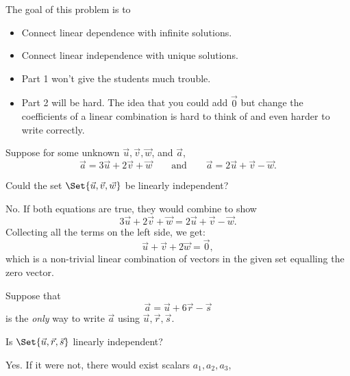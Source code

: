\documentclass{workbook}
\newcommand{\displayonlynewpage}{\begin{displayonly}\newpage\end{displayonly}}
\newcommand{\bookonlynewpage}{\begin{bookonly}\newpage\end{bookonly}}
\begin{document}
\begin{slide}
	\displayonlynewpage
	\bookonlynewpage
	\question
	\begin{annotation}
		\begin{goals}

			The goal of this problem is to
			\begin{itemize}
				\item Connect linear dependence with infinite solutions.
				\item Connect linear independence with unique solutions.
			\end{itemize}
		\end{goals}

		\begin{notes}
			\begin{itemize}
				\item Part 1 won't give the students much trouble.
				\item Part 2 will be hard. The idea that you could add $\vec 0$
					but change the coefficients of a linear combination
					is hard to think of and even harder to write correctly.
			\end{itemize}
		\end{notes}
	\end{annotation}
	Suppose for some unknown $\vec u, \vec v, \vec w$, and $\vec a$,
	\[
		\vec a = 3\vec u+2\vec v +\vec w\qquad \text{and}\qquad
		\vec a = 2\vec u+\vec v -\vec w.
	\]
	\begin{parts}
		\item Could the set $\Set{\vec u,\vec v,\vec w}$ be linearly
		independent?
			\begin{solution}
				No. If both equations are true, they would combine to show
				\[
					3\vec u+2\vec v +\vec w = 2\vec u+\vec v -\vec w.
				\]
				Collecting all the terms on the left side, we get:
				\[
					\vec u + \vec v + 2\vec w = \vec 0,
				\]
				which is a non-trivial linear combination of vectors in the given
				set equalling the zero vector.
			\end{solution}
	\end{parts}
	Suppose that
	\[
		\vec a = \vec u+6\vec r-\vec s
	\]
	is the \emph{only} way to write $\vec a$ using $\vec u,\vec r,\vec s$.
	\begin{parts}[resume]
		\item Is $\Set{\vec u,\vec r,\vec s}$ linearly independent?
			\begin{solution}
				Yes. If it were not, there would exist scalars $a_1, a_2, a_3$,

\end{solution}
\end{parts}
\end{slide}
\end{document}
